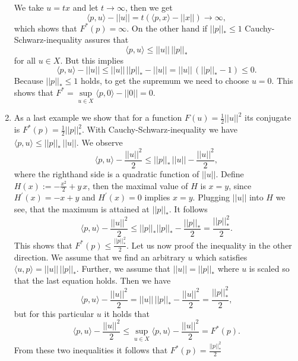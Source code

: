 \begin{example}
\begin{enumerate}
            We take $u = tx$ and let $t \longrightarrow \infty$, then we get
                $$
                    \langle p, u \rangle - ||u|| = t(\langle p, x \rangle - ||x||) \longrightarrow \infty,
                $$
            which shows that $F^{\ast}(p) = \infty$. On the other hand if $||p||_{\ast} \le 1$ Cauchy-Schwarz-inequality assures that
                $$
                    \langle p, u \rangle \le ||u|| \, ||p||_{\ast}
                $$
            for all $u \in X$. But this implies
                $$
                    \langle p, u \rangle - ||u|| \le ||u|| \, ||p||_{\ast} - ||u|| = ||u|| \, (||p||_{\ast} - 1) \le 0.
                $$
            Because $||p||_{\ast} \le 1$ holds, to get the supremum we need to choose $u = 0$. This shows that $F^{\ast} = \sup\limits_{u \in X} \langle p, 0 \rangle - ||0|| = 0$.
            \item As a last example we show that for a function $F(u) = \frac{1}{2} ||u||^{2}$ its conjugate is $F^{\ast}(p) = \frac{1}{2} ||p||_{\ast}^{2}$. With Cauchy-Schwarz-inequality we have $\langle p, u \rangle \le ||p||_{\ast}\,||u||$. We observe
                $$
                    \langle p, u \rangle - \frac{||u||^{2}}{2} \le ||p||_{\ast}\,||u|| - \frac{||u||^{2}}{2},
                $$
            where the righthand side is a quadratic function of $||u||$. Define $H(x) := -\frac{x^{2}}{2} + y\,x$, then the maximal value of $H$ is $x = y$, since $H^{'}(x) = -x + y$ and $H^{'}(x) = 0$ implies $x = y$. Plugging $||u||$ into $H$ we see, that the maximum is attained at $||p||_{\ast}$. It follows
                $$
                    \langle p, u \rangle - \frac{||u||^{2}}{2} \le ||p||_{\ast} ||p||_{\ast} - \frac{||p||_{\ast}}{2} = \frac{||p||_{\ast}^{2}}{2}.
                $$
            This shows that $F^{\ast}(p) \le \frac{||p||_{\ast}^{2}}{2}$. Let us now proof the inequality in the other direction. We assume that we find an arbitrary $u$ which satisfies $\langle u, p \rangle = ||u||\,||p||_{\ast}$. Further, we assume that $||u|| = ||p||_{\ast}$ where $u$ is scaled so that the last equation holds. Then we have
                $$
                    \langle p, u \rangle - \frac{||u||^{2}}{2} = ||u||\,||p||_{\ast} - \frac{||u||^{2}}{2} = \frac{||p||^{2}_{\ast}}{2},
                $$
            but for this particular $u$ it holds that
                $$
                    \langle p, u \rangle - \frac{||u||^{2}}{2} \le \sup\limits_{u \in X} \langle p, u \rangle - \frac{||u||^{2}}{2} = F^{\ast}(p).
                $$
            From these two inequalities it follows that $F^{\ast}(p) = \frac{||p||_{\ast}^{2}}{2}$
        \end{enumerate}
    \end{example}

